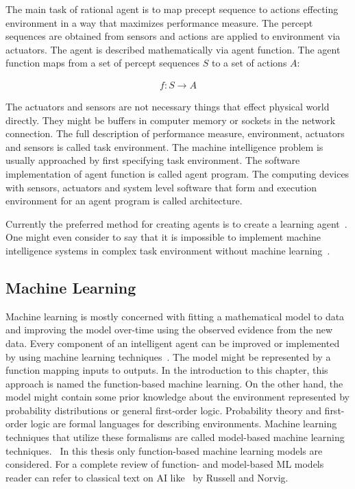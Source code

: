 \documentclass[english, 12pt, a4paper, elec, utf8, online]{aaltothesis}
\begin{document}
The main task of rational agent is to map precept sequence to actions effecting environment in a way that maximizes performance measure. The percept sequences are obtained from sensors and actions are applied to environment via actuators. The agent is described mathematically via agent function. The agent function maps from a set of percept sequences $S$ to a set of actions $A$:

\begin{align*}
f:S \rightarrow A
\end{align*}

The actuators and sensors are not necessary things that effect physical world directly. They might be buffers in computer memory or sockets in the network connection. The full description of performance measure, environment, actuators and sensors is called task environment. The machine intelligence problem is usually approached by first specifying task environment. The software implementation of agent function is called agent program. The computing devices with sensors, actuators and system level software that form and execution environment for an agent program is called architecture.~\cite{AIMA}   

Currently the preferred method for creating agents is to create a learning agent~\cite{AIMA}. One might even consider to say that it is impossible to implement machine intelligence systems in complex task environment without machine learning~\cite{Jung2018}.         

\subsection{Machine Learning}
Machine learning is mostly concerned with fitting a mathematical model to data and improving the model over-time using the observed evidence from the new data. Every component of an intelligent agent can be improved or implemented by using machine learning techniques~\cite{AIMA}. The model might be represented by a function mapping inputs to outputs. In the introduction to this chapter, this approach is named the function-based machine learning. On the other hand, the model might contain some prior knowledge about the environment represented by probability distributions or general first-order logic. Probability theory and first-order logic are formal languages for describing environments. Machine learning techniques that utilize these formalisms are called model-based machine learning techniques.~\cite{Jung2018, AIMA, Darwiche17} In this thesis only function-based machine learning models are considered. For a complete review of function- and model-based ML models reader can refer to classical text on AI like~\cite{AIMA} by Russell and Norvig.
\end{document}
